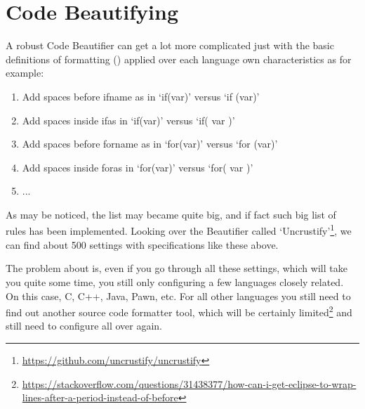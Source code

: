 \section{Code Beautifying}

A robust Code Beautifier can get a lot more complicated just with the basic
definitions of formatting ()
applied over each language own characteristics
as for example:

\begin{enumerate}
    \item Add spaces before if\s name as in `if(var)' versus `if (var)'
    \item Add spaces inside if\s as in `if(var)' versus `if( var )'
    \item Add spaces before for\s name as in `for(var)' versus `for (var)'
    \item Add spaces inside for\s as in `for(var)' versus `for( var )'
    \item ...
\end{enumerate}

As may be noticed, the list may became quite big,
and if fact such big list of rules has been implemented.
Looking over the Beautifier called
`Uncrustify'\footnote{\url{https://github.com/uncrustify/uncrustify}},
we can find about 500 settings with specifications like these above.

The problem about is, even if you go through all these settings,
which will take you quite some time,
you still only configuring a few languages closely related.
On this case, C, C++, Java, Pawn, etc.
For all other languages you still need to find out another source code
formatter tool, which will be certainly
limited\footnote{\url{https://stackoverflow.com/questions/31438377/how-can-i-get-eclipse-to-wrap-lines-after-a-period-instead-of-before}}
and still need to configure all over again.


